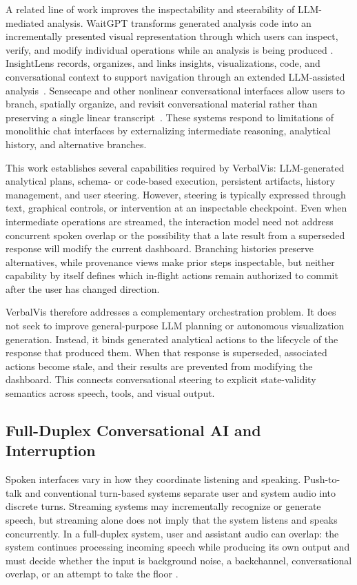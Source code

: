 \documentclass[journal]{IEEEtran}
\begin{document}
A related line of work improves the inspectability and steerability of
LLM-mediated analysis. WaitGPT transforms generated analysis code into an
incrementally presented visual representation through which users can inspect,
verify, and modify individual operations while an analysis is being produced
\cite{xie2024waitgpt}. InsightLens records, organizes, and links insights,
visualizations, code, and conversational context to support navigation through
an extended LLM-assisted analysis~\cite{weng2025insightlens}. Sensecape and
other nonlinear conversational interfaces allow users to branch, spatially
organize, and revisit conversational material rather than preserving a single
linear transcript~\cite{suh2023sensecape}. These systems respond to limitations
of monolithic chat interfaces by externalizing intermediate reasoning,
analytical history, and alternative branches.

This work establishes several capabilities required by VerbalVis:
LLM-generated analytical plans, schema- or code-based execution, persistent
artifacts, history management, and user steering. However, steering is
typically expressed through text, graphical controls, or intervention at an
inspectable checkpoint. Even when intermediate operations are streamed, the
interaction model need not address concurrent spoken overlap or the
possibility that a late result from a superseded response will modify the
current dashboard. Branching histories preserve alternatives, while
provenance views make prior steps inspectable, but neither capability by itself
defines which in-flight actions remain authorized to commit after the user has
changed direction.

VerbalVis therefore addresses a complementary orchestration problem. It does
not seek to improve general-purpose LLM planning or autonomous visualization
generation. Instead, it binds generated analytical actions to the lifecycle of
the response that produced them. When that response is superseded, associated
actions become stale, and their results are prevented from modifying the
dashboard. This connects conversational steering to explicit state-validity
semantics across speech, tools, and visual output.

\subsection{Full-Duplex Conversational AI and Interruption}
\label{sec:rw-duplex}

Spoken interfaces vary in how they coordinate listening and speaking.
Push-to-talk and conventional turn-based systems separate user and system
audio into discrete turns. Streaming systems may incrementally recognize or
generate speech, but streaming alone does not imply that the system listens
and speaks concurrently. In a full-duplex system, user and assistant audio can
overlap: the system continues processing incoming speech while producing its
own output and must decide whether the input is background noise, a
backchannel, conversational overlap, or an attempt to take the floor
\cite{skantze2021turntaking}.
\end{document}

